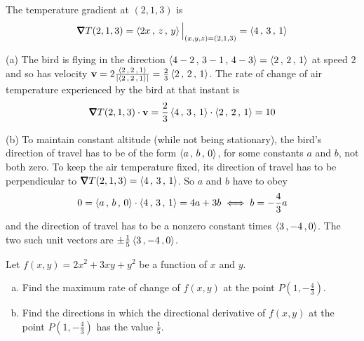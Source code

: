 \begin{solution}
The temperature gradient at $(2,1,3)$ is
\begin{align*}
\vnabla T(2,1,3) = \llt 2x\,,\,z\,,\,y \rgt\Big|_{(x,y,z)=(2,1,3)}
                 = \llt 4\,,\,3\,,\,1 \rgt
\end{align*}

(a) The bird is flying in the direction $\left< 4-2\,,\,3-1\,,\,4-3 \right>
=\left< 2\,,\,2\,,\,1\right>$ at speed $2$ and so has velocity
$
\mathbf{v}=2\frac{\left< 2\,,\,2\,,\,1\right>}{|\left< 2\,,\,2\,,\,1\right>|}
=\frac{2}{3} \left< 2\,,\,2\,,\,1\right>
$.
The rate of change of air temperature experienced by the bird at that 
instant is
\begin{align*}
\vnabla T(2,1,3) \cdot\vv
=\frac{2}{3} \llt 4\,,\,3\,,\,1 \rgt \cdot \llt 2\,,\,2\,,\,1\rgt
= 10
\end{align*}

(b) To maintain constant altitude (while not being stationary), 
the bird's direction of travel has to be 
of the form $\left< a\,,\,b\,,\,0\right>$, for some constants $a$ and $b$,
not both zero. To keep the air temperature fixed, its direction of travel
has to be perpendicular to $\vnabla T(2,1,3)= \llt 4\,,\,3\,,\,1 \rgt$.
So $a$ and $b$ have to obey
\begin{align*}
0 = \left< a\,,\,b\,,\,0\right> \cdot \left< 4\,,\,3\,,\,1 \right>
  = 4a+3b
\iff b=-\frac{4}{3}a
\end{align*}
and the direction of travel has to be a nonzero constant times 
$\left< 3\,,-4\,,0\right>$. The two such unit vectors are 
$\pm \frac{1}{5}\left< 3\,,-4\,,0\right>$.
\end{solution}

\begin{question}[M200 2009A] %
Let $f(x,y) = 2x^2 + 3xy + y^2$ be a function of $x$ and $y$.

\begin{enumerate}[(a)]
\item
Find the maximum rate of change of $f(x,y)$ at the point 
$P\left(1, -\frac{4}{3}\right)$.


\item
Find the directions in which the directional derivative of $f(x,y)$ 
at the point $P\left(1, -\frac{4}{3}\right)$ has the value $\frac{1}{5}$.
\end{enumerate}

\end{question}

%


